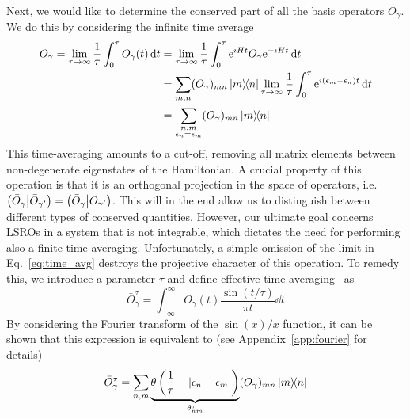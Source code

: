 Next, we would like to determine the conserved part of all the basis operators \(O_{\gamma}\). We do this
by considering the infinite time average
\begin{align}
  \bar{O}_{\gamma} = \lim_{\tau\to\infty}\frac{1}{\tau} \int_0^{\tau} O_{\gamma}(t) \dd{t} & =
  \lim_{\tau\to\infty}\frac{1}{\tau} \int_0^{\tau} \mathrm{e}^{i H t}O_{\gamma} \mathrm{e}^{-i H t} \dd{t} \nonumber                                                                                                                                       \\
                                                                                                  & = \sum_{m,n} (O_{\gamma})_{mn}\ketbra{m}{n} \lim_{\tau\to\infty} \frac{1}{\tau} \int_0^{\tau} \mathrm{e}^{i(\epsilon_m-\epsilon_n)t} \dd{t} \nonumber \\
                                                                                                  & = \sum_{\substack{n,m                                                                                                                                         \\ \epsilon_n = \epsilon_m}} (O_{\gamma})_{mn}\ketbra{m}{n}
  \label{eq:time_avg}
\end{align}
This time-averaging amounts to a cut-off, removing all matrix elements between non-degenerate eigenstates
of the Hamiltonian. A crucial property of this operation is that it is an orthogonal projection
in the space of operators, i.e. \(\left(\bar{O}_{\gamma} \middle| \bar{O}_{\gamma^{\prime}}\right) = \left(\bar{O}_{\gamma} \middle| O_{\gamma^{\prime}}\right)\). This will
in the end allow us to distinguish between different types of conserved quantities.
However, our ultimate goal concerns LSROs in a system that is not integrable, which dictates the
need for performing also a finite-time averaging. Unfortunately, a simple omission of the limit
in Eq.~\eqref{eq:time_avg} destroys the projective character of this operation. To remedy this,
we introduce a parameter \(\tau\) and define effective time averaging~\autocite{Mierzejewski2015}
as
\begin{equation}
  \bar{O}_{\gamma}^{\tau} = \int_{-\infty}^{\infty} O_{\gamma}(t) \frac{\sin(t/\tau)}{\pi t} \dd{t}
  \label{eq:finite_time_avg_integral}
\end{equation}
By considering the Fourier transform of the \(\sin(x)/x\) function, it can be shown that
this expression is equivalent to (see Appendix~\ref{app:fourier} for details)
\begin{equation}
  \bar{O}_{\gamma}^{\tau} = \sum_{n,m} \underbrace{\theta\left(\frac{1}{\tau} - |\epsilon_n - \epsilon_m|\right)}_{\theta_{nm}^{\tau}} (O_{\gamma})_{mn} \ketbra{m}{n}
  \label{eq:finite_time_avg}
\end{equation}
